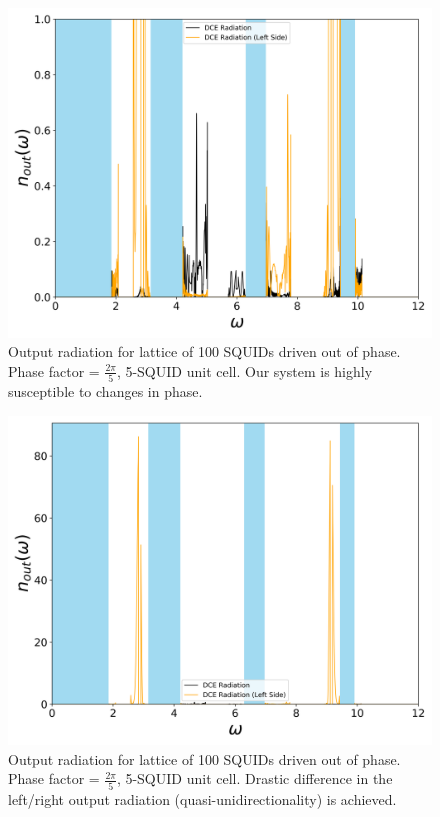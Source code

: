 \begin{figure}[h]
    \centering
    \includegraphics[width=\textwidth, keepaspectratio]{figures/results/phase_shift_2pi_5_both_zoom.png}
    \caption{Output radiation for lattice of 100 SQUIDs driven out of phase. Phase factor = $\frac{2\pi}{5}$, 5-SQUID unit cell. Our system is highly susceptible to changes in phase.}
    \label{fig:phase_2pi_5_both}
\end{figure}
\clearpage
%
\begin{figure}[h]
    \centering
    \includegraphics[width=\textwidth, keepaspectratio]{figures/results/phase_shift_2pi_5_both.png}
    \caption{Output radiation for lattice of 100 SQUIDs driven out of phase. Phase factor = $\frac{2\pi}{5}$, 5-SQUID unit cell. Drastic difference in the left/right output radiation (quasi-unidirectionality) is achieved.}
    \label{fig:phase_2pi_5_both_zoomed}
\end{figure}
\clearpage
